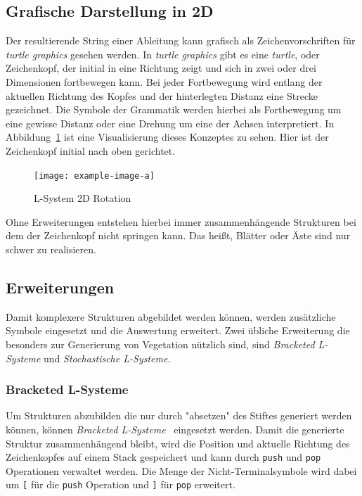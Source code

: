 \subsection{Grafische Darstellung in 2D}
Der resultierende String einer Ableitung kann grafisch als Zeichenvorschriften für \emph{turtle graphics} gesehen werden. %
In \emph{turtle graphics} gibt es eine \emph{turtle}, oder Zeichenkopf, der initial in eine Richtung zeigt und sich in zwei oder drei Dimensionen fortbewegen kann.
Bei jeder Fortbewegung wird entlang der aktuellen Richtung des Kopfes und der hinterlegten Distanz eine Strecke gezeichnet.
Die Symbole der Grammatik werden hierbei als Fortbewegung um eine gewisse Distanz oder eine Drehung um eine der Achsen interpretiert.
In Abbildung~\ref{fig:L-System 2D Rotation} ist eine Visualisierung dieses Konzeptes zu sehen.
Hier ist der Zeichenkopf initial nach oben gerichtet.
\begin{figure}[ht]
    \centering
        
    \texttt{[image: example-image-a]}
    \caption{L-System 2D Rotation}\label{fig:L-System 2D Rotation}
\end{figure}

Ohne Erweiterungen entstehen hierbei immer zusammenhängende Strukturen bei dem der Zeichenkopf nicht springen kann.
Das heißt, Blätter oder Äste sind nur schwer zu realisieren.


\subsection{Erweiterungen}
Damit komplexere Strukturen abgebildet werden können, werden zusätzliche Symbole eingesetzt und die Auswertung erweitert.
Zwei übliche Erweiterung die besonders zur Generierung von Vegetation nützlich sind, sind \emph{Bracketed L-Systeme} und \emph{Stochastische L-Systeme}.

\subsubsection{Bracketed L-Systeme}
Um Strukturen abzubilden die nur durch "absetzen" des Stiftes generiert werden können, können \emph{Bracketed L-Systeme}~\cite*{Shaker2016} eingesetzt werden.
Damit die generierte Struktur zusammenhängend bleibt, wird die Position und aktuelle Richtung des Zeichenkopfes auf einem Stack gespeichert und kann durch \texttt{push} und \texttt{pop} Operationen verwaltet werden.
Die Menge der Nicht-Terminalsymbole wird dabei um \texttt{[} für die \texttt{push} Operation und \texttt{]} für \texttt{pop} erweitert.

